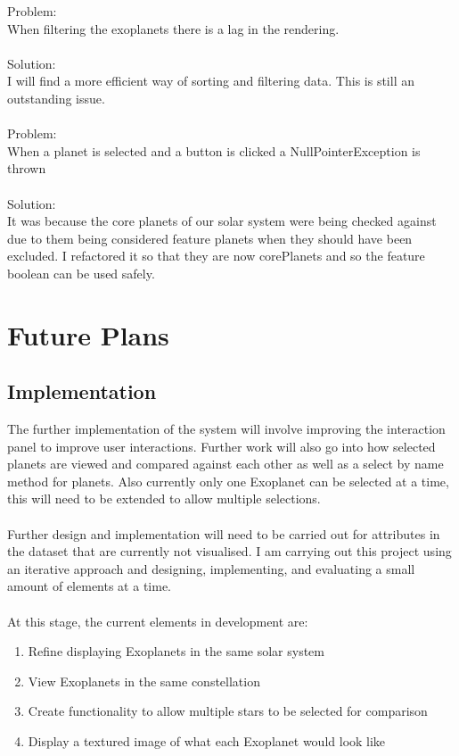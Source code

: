 \documentclass[11pt
              , a4paper
              , twoside
              , openright
              ]{report}
\begin{document}
Problem:\\
When filtering the exoplanets there is a lag in the rendering. 
\\\\
Solution:\\
I will find a more efficient way of sorting and filtering data. This is still an
outstanding issue.
\\\\
Problem:\\
When a planet is selected and a button is clicked a NullPointerException is
thrown
\\\\
Solution:\\
It was because the core planets of our solar system were being checked against
due to them being considered feature planets when they should have been
excluded. I refactored it so that they are now corePlanets and so the feature
boolean can be used safely.
\chapter{Future Plans}
\section{Implementation}
The further implementation of the system will involve improving the interaction
panel to improve user interactions. Further work will also go into how selected
planets are viewed and compared against each other as well as a select by name
method for planets. Also currently only one Exoplanet can be selected at a time,
this will need to be extended to allow multiple selections. 
\\\\
Further design and implementation will need to be carried out for attributes in
the dataset that are currently not visualised. I am carrying out this project
using an iterative approach and designing, implementing, and evaluating a small
amount of elements at a time.
\\\\
At this stage, the current elements in development are:
\begin{enumerate}
 \item Refine displaying Exoplanets in the same solar system
 \item View Exoplanets in the same constellation
 \item Create functionality to allow multiple stars to be selected for
comparison
 \item Display a textured image of what each Exoplanet would look like
\end{enumerate}
\end{document}
